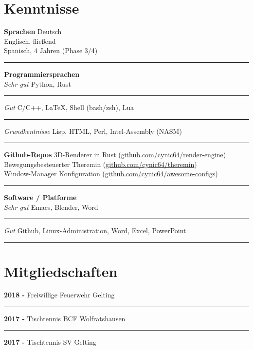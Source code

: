 \documentclass[12pt]{article}
\newcommand{\link}[1]{{\color{blue}\underline{#1}}}
\newcommand{\sect}[1]{\vspace{-12pt}\section*{#1}\vspace{-12pt}}
\newcommand{\sep}{{\color{gray}\vspace{-12pt}\hrule}}
\begin{document}
  \sect{Kenntnisse}
  \textbf{Sprachen} \hfill{Deutsch} \\
  \hspace*{\fill}Englisch, flie{\ss}end \\
  \hspace*{\fill}Spanisch, 4 Jahren (Phase 3/4) \\
  \sep

  \vspace{\parskip}

  \textbf{Programmiersprachen} \\
  \textit{Sehr gut} \hfill{Python, Rust} \\
  \sep
  \textit{Gut} \hfill{C/C++, \LaTeX, Shell (bash/zsh), Lua} \\
  \sep
  \textit{Grundkentnisse} \hfill{Lisp, HTML, Perl, Intel-Assembly (NASM)} \\
  \sep

  \vspace{\parskip}

  \textbf{Github-Repos} \hfill{3D-Renderer in Rust (\link{github.com/cynic64/render-engine})} \\
  \hspace*{\fill} Bewegungsbesteuerter Theremin (\link{github.com/cynic64/theremin}) \\
  \hspace*{\fill} Window-Manager Konfiguration (\link{github.com/cynic64/awesome-configs}) \\

  \vspace{4pt}
  \sep

  \vspace{\parskip}

  \textbf{Software / Platforme} \\
  \textit{Sehr gut} \hfill{Emacs, Blender, Word} \\
  \sep
  \textit{Gut} \hfill{Github, Linux-Administration, Word, Excel, PowerPoint} \\
  \sep

  \vspace{\parskip}
  \sect{Mitgliedschaften}

  \textbf{2018 - } \hfill{Freiwillige Feuerwehr Gelting} \\
  \sep
  \textbf{2017 - } \hfill{Tischtennis BCF Wolfratshausen} \\
  \sep
  \textbf{2017 - } \hfill{Tischtennis SV Gelting}
\end{document}
